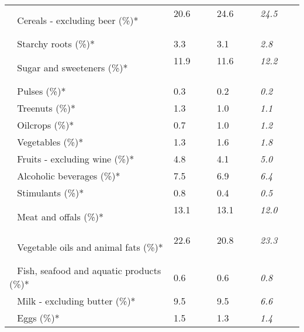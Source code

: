 \begin{tabular}{L{3.9cm} R{1cm} R{1cm} R{1cm}}
	 ~ Cereals - excluding beer (\%)* & 20.6 ~ \ \ & 24.6 ~ \ \ & \textit{24.5} ~ \ \ \\ 
	 ~ Starchy roots (\%)* & 3.3 ~ \ \ & 3.1 ~ \ \ & \textit{2.8} ~ \ \ \\ 
	 ~ Sugar and sweeteners (\%)* & 11.9 ~ \ \ & 11.6 ~ \ \ & \textit{12.2} ~ \ \ \\ 
	 ~ Pulses (\%)* & 0.3 ~ \ \ & 0.2 ~ \ \ & \textit{0.2} ~ \ \ \\ 
	 ~ Treenuts (\%)* & 1.3 ~ \ \ & 1.0 ~ \ \ & \textit{1.1} ~ \ \ \\ 
	 ~ Oilcrops (\%)* & 0.7 ~ \ \ & 1.0 ~ \ \ & \textit{1.2} ~ \ \ \\ 
	 ~ Vegetables (\%)* & 1.3 ~ \ \ & 1.6 ~ \ \ & \textit{1.8} ~ \ \ \\ 
	 ~ Fruits - excluding wine (\%)* & 4.8 ~ \ \ & 4.1 ~ \ \ & \textit{5.0} ~ \ \ \\ 
	 ~ Alcoholic beverages (\%)* & 7.5 ~ \ \ & 6.9 ~ \ \ & \textit{6.4} ~ \ \ \\ 
	 ~ Stimulants (\%)* & 0.8 ~ \ \ & 0.4 ~ \ \ & \textit{0.5} ~ \ \ \\ 
	 ~ Meat and offals (\%)* & 13.1 ~ \ \ & 13.1 ~ \ \ & \textit{12.0} ~ \ \ \\ 
	 ~ Vegetable oils and animal fats (\%)* & 22.6 ~ \ \ & 20.8 ~ \ \ & \textit{23.3} ~ \ \ \\ 
	 ~ Fish, seafood and aquatic products (\%)* & 0.6 ~ \ \ & 0.6 ~ \ \ & \textit{0.8} ~ \ \ \\ 
	 ~ Milk - excluding butter (\%)* & 9.5 ~ \ \ & 9.5 ~ \ \ & \textit{6.6} ~ \ \ \\ 
	 ~ Eggs (\%)* & 1.5 ~ \ \ & 1.3 ~ \ \ & \textit{1.4} ~ \ \ \\ 
       \toprule
      \end{tabular}
      \clearpage
{}
